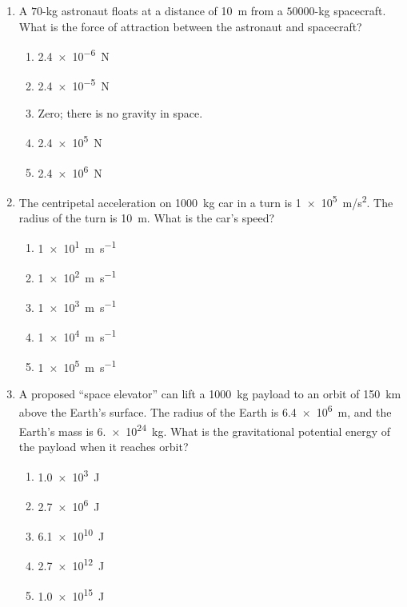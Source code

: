 \documentclass{../../oss-apphys}
\begin{document}
\begin{multicols}{2}
\begin{enumerate}[leftmargin=18pt,resume]
  \item A $70$-\si{\kilo\gram} astronaut floats at a distance of \SI{10}{\metre}
    from a $50000$-\si{\kilo\gram} spacecraft. What is the force of attraction
    between the astronaut and spacecraft?
    \begin{enumerate}[noitemsep,topsep=0pt,leftmargin=18pt,label=(\Alph*)]
    \item\SI{2.4e-6}{\newton}
    \item\SI{2.4e-5}{\newton}
    \item Zero; there is no gravity in space.
    \item\SI{2.4e5}{\newton}
    \item\SI{2.4e6}{\newton}
    \end{enumerate}
    
  \item The centripetal acceleration on \SI{1000}{\kilo\gram} car in a turn is
    \SI{1e5}{m/s^2}. The radius of the turn is \SI{10}{\metre}. What is the
    car's speed?
    \begin{enumerate}[noitemsep,topsep=0pt,leftmargin=18pt,label=(\Alph*)]
    \item\SI{1e1}{\metre\per\second}
    \item\SI{1e2}{\metre\per\second}
    \item\SI{1e3}{\metre\per\second}
    \item\SI{1e4}{\metre\per\second}
    \item\SI{1e5}{\metre\per\second}
    \end{enumerate}
  
  \item A proposed ``space elevator'' can lift a \SI{1000}{\kilo\gram} payload
    to an orbit of \SI{150}{\kilo\metre} above the Earth's surface. The radius
    of the Earth is \SI{6.4e6}{\metre}, and the Earth's mass is
    \SI{6.e24}{\kilo\gram}. What is the gravitational potential energy of the
    payload when it reaches orbit?
    \begin{enumerate}[noitemsep,topsep=0pt,leftmargin=18pt,label=(\Alph*)]
    \item\SI{1.0e3}{\joule}
    \item\SI{2.7e6}{\joule}
    \item\SI{6.1e10}{\joule}
    \item\SI{2.7e12}{\joule}
    \item\SI{1.0e15}{\joule}
    \end{enumerate}


\end{enumerate}
\end{multicols}
\end{document}
